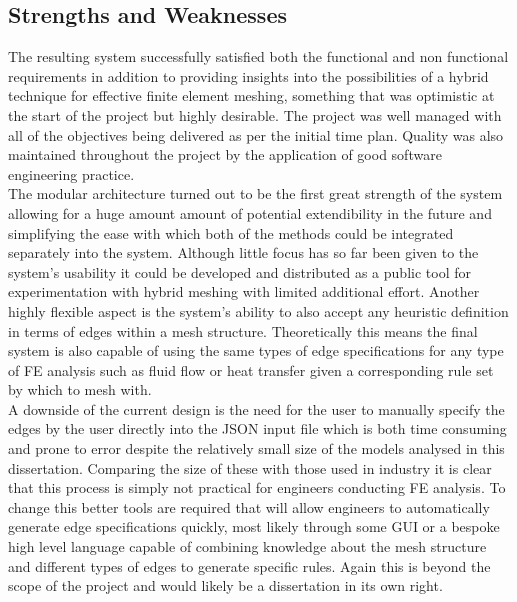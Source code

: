 \subsection{Strengths and Weaknesses}
The resulting system successfully satisfied both the functional and non functional requirements in addition to providing insights into the possibilities of a hybrid technique for effective finite element meshing, something that was optimistic at the start of the project but highly desirable. The project was well managed with all of the objectives being delivered as per the initial time plan. Quality was also maintained throughout the project by the application of good software engineering practice. \\

\noindent
The modular architecture turned out to be the first great strength of the system allowing for a huge amount amount of potential extendibility in the future and simplifying the ease with which both of the methods could be integrated separately into the system. Although little focus has so far been given to the system's usability it could be developed and distributed as a public tool for experimentation with hybrid meshing with limited additional effort. Another highly flexible aspect is the system's ability to also accept any heuristic definition in terms of edges within a mesh structure. Theoretically this means the final system is also capable of using the same types of edge specifications for any type of FE analysis such as fluid flow or heat transfer given a corresponding rule set by which to mesh with. \\


\noindent
A downside of the current design is the need for the user to manually specify the edges by the user directly into the JSON input file which is both time consuming and prone to error despite the relatively small size of the models analysed in this dissertation. Comparing the size of these with those used in industry it is clear that this process is simply not practical for engineers conducting FE analysis. To change this better tools are required that will allow engineers to automatically generate edge specifications quickly, most likely through some GUI or a bespoke high level language capable of combining knowledge about the mesh structure and different types of edges to generate specific rules. Again this is beyond the scope of the project and would likely be a dissertation in its own right. \\


